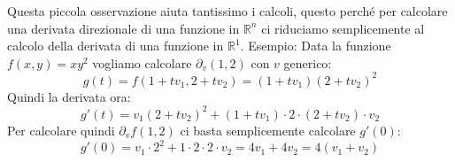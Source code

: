 Questa piccola osservazione aiuta tantissimo i calcoli, questo perché per calcolare una derivata direzionale di una funzione in $\mathbb{R}^n$ ci riduciamo semplicemente al calcolo della derivata di una funzione in $\mathbb{R}^1$. Esempio: Data la funzione $f(x, y) = xy^2$ vogliamo calcolare $\partial_v (1, 2)$ con $v$ generico:
\begin{equation*}
	g(t) = f(1 + tv_1, 2 + tv_2) = (1 + tv_1)(2 + tv_2)^2
\end{equation*}
Quindi la derivata ora:
\begin{equation*}
	g'(t) = v_1(2 + tv_2)^2 + (1+tv_1) \cdot 2 \cdot (2 + tv_2) \cdot v_2
\end{equation*}
Per calcolare quindi $\partial_v f(1, 2)$ ci basta semplicemente calcolare $g'(0)$:
\begin{equation*}
	g'(0) = v_1 \cdot 2^2 + 1 \cdot 2 \cdot 2 \cdot v_2 = 4v_1 + 4v_2 = 4(v_1 + v_2)
\end{equation*}



